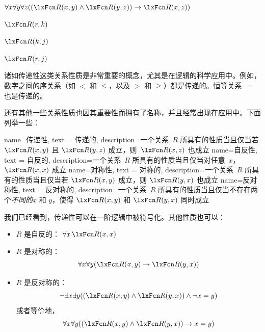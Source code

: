 \begin{earg}
	\item $\forall x\forall y\forall z((\atom{R}{x,y} \eand \atom{R}{y,z}) \eif
	\atom{R}{x,z})$
	\item $\atom{R}{r,k}$
	\item $\atom{R}{k,j}$
	\item[\texttherefore] $\atom{R}{r,j}$
\end{earg}

诸如传递性这类关系性质是非常重要的概念，尤其是在逻辑的科学应用中。例如，数字之间的序关系（如 $<$ 和 $\le$，以及 $>$ 和 $\ge$）都是传递的。恒等关系~$=$ 也是传递的。

还有其他一些关系性质也因其重要性而拥有了名称，并且经常出现在应用中。下面列举一些：


{
  name=传递性,
  text = 传递的,
  description={一个关系~$R$ 所具有的性质当且仅当若 $\atom{R}{x,y}$ 且 $\atom{R}{y,z}$ 成立，则~$\atom{R}{x,z}$ 也成立}
}
{
  name=自反性,
  text = 自反的,
  description={一个关系~$R$ 所具有的性质当且仅当对任意~$x$，$\atom{R}{x,x}$ 成立}
}
{
  name=对称性,
  text = 对称的,
  description={一个关系~$R$ 所具有的性质当且仅当若 $\atom{R}{x,y}$ 成立，则 $\atom{R}{y,x}$ 也成立}
}
{
  name=反对称性,
  text = 反对称的,
  description={一个关系~$R$ 所具有的性质当且仅当不存在两个\emph{不同的}$x$ 和 $y$，使得 $\atom{R}{x,y}$ 和 $\atom{R}{y,x}$ 同时成立}
}

我们已经看到，传递性可以在一阶逻辑中被符号化。其他性质也可以：

\begin{itemize}
	\item $R$ 是自反的： $\forall x\,\atom{R}{x,x}$
	\item $R$ 是对称的： \[\forall x\forall y(\atom{R}{x,y} \eif \atom{R}{y,x})\]
	\item $R$ 是反对称的： \[\lnot\exists x\exists y((\atom{R}{x,y}
	\eand \atom{R}{y,x}) \eand \enot x=y)\]或者等价地，\[\forall x\forall y((\atom{R}{x,y}
	\eand \atom{R}{y,x}) \eif x=y)\]
\end{itemize}

